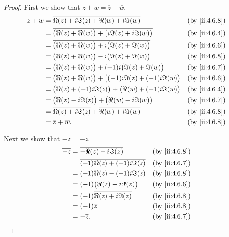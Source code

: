 \begin{proof}
  First we show that \(\overline{z + w} = \overline{z} + \overline{w}\).
  \begin{align*}
    \overline{z + w} & = \overline{\Re(z) + i \Im(z) + \Re(w) + i \Im(w)}                     &  & \by{ii:4.6.8} \\
                     & = \overline{\big(\Re(z) + \Re(w)\big) + \big(i \Im(z) + i \Im(w)\big)} &  & \by{ii:4.6.4} \\
                     & = \overline{\big(\Re(z) + \Re(w)\big) + i \big(\Im(z) + \Im(w)\big)}   &  & \by{ii:4.6.6} \\
                     & = \big(\Re(z) + \Re(w)\big) - i \big(\Im(z) + \Im(w)\big)              &  & \by{ii:4.6.8} \\
                     & = \big(\Re(z) + \Re(w)\big) + (-1) i \big(\Im(z) + \Im(w)\big)         &  & \by{ii:4.6.7} \\
                     & = \big(\Re(z) + \Re(w)\big) + \big((-1) i \Im(z) + (-1) i \Im(w)\big)  &  & \by{ii:4.6.6} \\
                     & = \big(\Re(z) + (-1) i \Im(z)\big) + \big(\Re(w) + (-1) i \Im(w)\big)  &  & \by{ii:4.6.4} \\
                     & = \big(\Re(z) - i \Im(z)\big) + \big(\Re(w) - i \Im(w)\big)            &  & \by{ii:4.6.7} \\
                     & = \overline{\Re(z) + i \Im(z)} + \overline{\Re(w) + i \Im(w)}          &  & \by{ii:4.6.8} \\
                     & = \overline{z} + \overline{w}.                                         &  & \by{ii:4.6.8}
  \end{align*}

  Next we show that \(\overline{-z} = -\overline{z}\).
  \begin{align*}
    \overline{-z} & = \overline{-\Re(z) - i \Im(z)}          &  & \by{ii:4.6.8} \\
                  & = \overline{(-1) \Re(z) + (-1) i \Im(z)} &  & \by{ii:4.6.7} \\
                  & = (-1) \Re(z) - (-1) i \Im(z)            &  & \by{ii:4.6.8} \\
                  & = (-1) \big(\Re(z) - i \Im(z)\big)       &  & \by{ii:4.6.6} \\
                  & = (-1) \overline{\Re(z) + i \Im(z)}      &  & \by{ii:4.6.8} \\
                  & = (-1) \overline{z}                      &  & \by{ii:4.6.8} \\
                  & = -\overline{z}.                         &  & \by{ii:4.6.7}
  \end{align*}


\end{proof}
